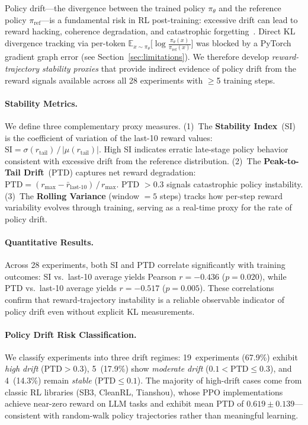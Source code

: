 \documentclass{article}
\begin{document}
Policy drift---the divergence between the trained policy $\pi_\theta$ and
the reference policy $\pi_{\mathrm{ref}}$---is a fundamental risk in RL
post-training: excessive drift can lead to reward hacking, coherence
degradation, and catastrophic forgetting~\citep{schulman2017proximal}.
Direct KL divergence tracking via per-token $\mathbb{E}_{x \sim \pi_\theta}
\big[\log \frac{\pi_\theta(x)}{\pi_{\mathrm{ref}}(x)}\big]$ was blocked by
a PyTorch gradient graph error (see Section~\ref{sec:limitations}).
We therefore develop \emph{reward-trajectory stability proxies} that
provide indirect evidence of policy drift from the reward signals
available across all 28 experiments with $\geq$5 training steps.

\paragraph{Stability Metrics.}
We define three complementary proxy measures.
(1)~The \textbf{Stability Index}~(SI) is the coefficient of variation of
the last-10 reward values:
$\mathrm{SI} = \sigma(r_{\text{tail}}) \,/\, |\mu(r_{\text{tail}})|$.
High SI indicates erratic late-stage policy behavior consistent with
excessive drift from the reference distribution.
(2)~The \textbf{Peak-to-Tail Drift}~(PTD) captures net reward degradation:
$\mathrm{PTD} = (r_{\max} - \bar{r}_{\text{last-10}}) \,/\, r_{\max}$.
PTD $> 0.3$ signals catastrophic policy instability.
(3)~The \textbf{Rolling Variance} (window $= 5$ steps) tracks how
per-step reward variability evolves through training, serving as a
real-time proxy for the rate of policy drift.

\paragraph{Quantitative Results.}
Across 28 experiments, both SI and PTD correlate significantly with
training outcomes:
SI vs.\ last-10 average yields Pearson $r = -0.436$ ($p = 0.020$),
while PTD vs.\ last-10 average yields $r = -0.517$ ($p = 0.005$).
These correlations confirm that reward-trajectory instability is a
reliable observable indicator of policy drift even without explicit
KL measurements.

\paragraph{Policy Drift Risk Classification.}
We classify experiments into three drift regimes:
19~experiments (67.9\%) exhibit \emph{high drift}
($\text{PTD} > 0.3$), 5~(17.9\%) show \emph{moderate drift}
($0.1 < \text{PTD} \leq 0.3$), and 4~(14.3\%) remain \emph{stable}
($\text{PTD} \leq 0.1$). The majority of high-drift cases come from
classic RL libraries (SB3, CleanRL, Tianshou), whose PPO
implementations achieve near-zero reward on LLM tasks and exhibit
mean PTD of $0.619 \pm 0.139$---consistent with random-walk policy
trajectories rather than meaningful learning.
\end{document}
